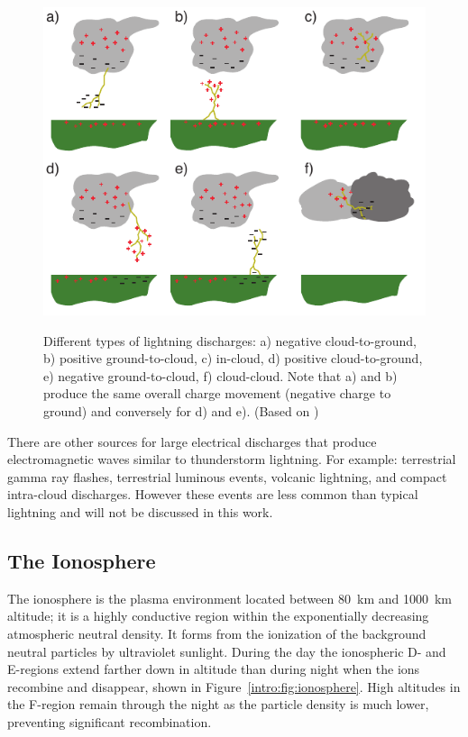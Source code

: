\begin{figure}[ht!]
	\centering
	\includegraphics[scale=1]{Introduction/Figures/lightning_types.pdf}\\
	\caption{Different types of lightning discharges:
			a) negative cloud-to-ground,
			b) positive ground-to-cloud,
			c) in-cloud,
			d) positive cloud-to-ground,
			e) negative ground-to-cloud,
			f) cloud-cloud.
			Note that a) and b) produce the same overall charge movement (negative charge to ground) and conversely for d) and e).
			 (Based on \citet{Uman1969})}
	\label{intro:fig:types}
\end{figure}

There are other sources for large electrical discharges that produce electromagnetic waves similar to thunderstorm lightning.
For example: terrestrial gamma ray flashes, terrestrial luminous events, volcanic lightning, and compact intra-cloud discharges.
However these events are less common than typical lightning and will not be discussed in this work.

\subsection{The Ionosphere}

The ionosphere is the plasma environment located between 80~km and 1000~km altitude; it is a highly conductive region within the exponentially decreasing atmospheric neutral density.
It forms from the ionization of the background neutral particles by ultraviolet sunlight.
During the day the ionospheric D- and E-regions extend farther down in altitude than during night when the ions recombine and disappear, shown in Figure~\ref{intro:fig:ionosphere}.
High altitudes in the F-region remain through the night as the particle density is much lower, preventing significant recombination.

